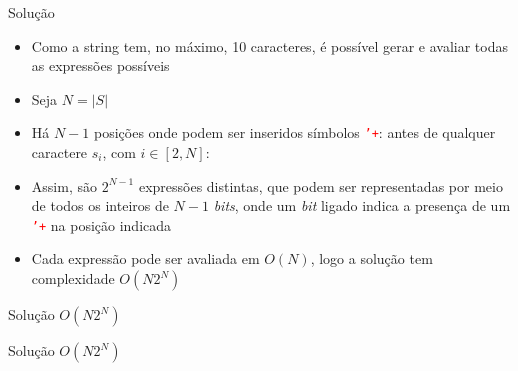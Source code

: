 \begin{frame}[fragile]{Solução}

    \begin{itemize}
        \item Como a string tem, no máximo, 10 caracteres, é possível gerar e avaliar todas as
            expressões possíveis

        \item Seja $N = |S|$

        \item Há $N - 1$ posições onde podem ser inseridos símbolos \texttt{\textcolor{red}{'+}}:
            antes de qualquer caractere $s_i$, com $i\in [2, N]$:

            

        \item Assim, são $2^{N - 1}$ expressões distintas, que podem ser representadas por meio de
            todos os inteiros de $N - 1$ \textit{bits}, onde um \textit{bit} ligado indica
            a presença de um \texttt{\textcolor{red}{'+}} na posição indicada

        \item Cada expressão pode ser avaliada em $O(N)$, logo a solução tem complexidade
            $O(N2^N)$
    
    \end{itemize}

\end{frame}

\begin{frame}[fragile]{Solução $O(N2^N)$}
\end{frame}

\begin{frame}[fragile]{Solução $O(N2^N)$}
\end{frame}
